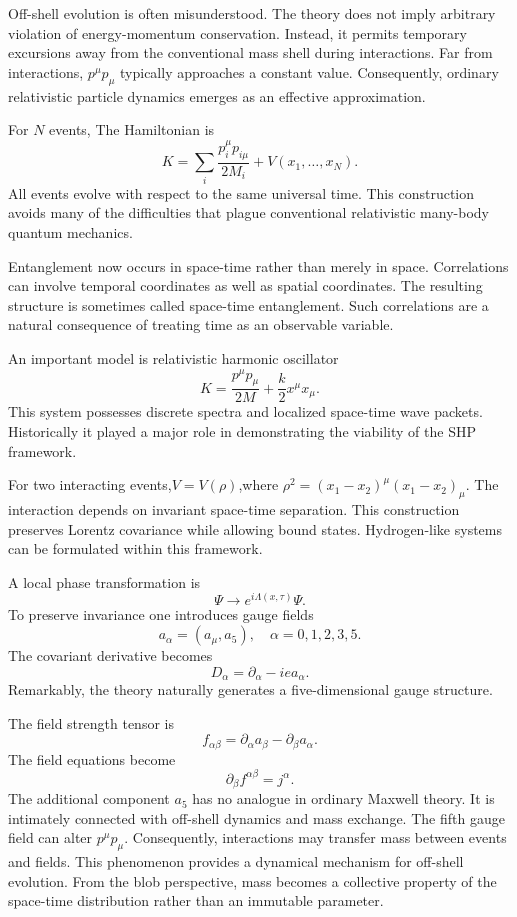 Off-shell evolution is often misunderstood.
The theory does not imply arbitrary violation of energy-momentum conservation.
Instead, it permits temporary excursions away from the conventional mass 
shell during interactions.
Far from interactions,
$p^\mu p_\mu$
typically approaches a constant value.
Consequently, ordinary relativistic particle dynamics emerges as an 
effective approximation.

For $N$ events,
The Hamiltonian is
\begin{equation}
    \label{shp-hn}
K = \sum_i \frac{p_i^\mu p_{i\mu}}{2M_i}+V(x_1,\ldots,x_N).
\end{equation}
All events evolve with respect to the same universal time.
This construction avoids many of the difficulties that plague 
conventional relativistic many-body quantum mechanics.

Entanglement now occurs in space-time rather than merely in space.
Correlations can involve temporal coordinates as well as spatial coordinates.
The resulting structure is sometimes called space-time entanglement.
Such correlations are a natural consequence of treating time as an 
observable variable.

An important model is relativistic harmonic oscillator
\begin{equation}
    \label{shm-osc}
K=\frac{p^\mu p_\mu}{2M}+\frac{k}{2}x^\mu x_\mu.
\end{equation}
This system possesses discrete spectra and localized space-time wave packets.
Historically it played a major role in demonstrating the viability of 
the SHP framework.

For two interacting events,$V=V(\rho)$,where $\rho^2=(x_1-x_2)^\mu(x_1-x_2)_\mu.$
The interaction depends on invariant space-time separation.
This construction preserves Lorentz covariance while allowing bound states.
Hydrogen-like systems can be formulated within this framework.

A local phase transformation is
\[\Psi \rightarrow e^{i\Lambda(x,\tau)}\Psi.\]
To preserve invariance one introduces gauge fields
\[ a_\alpha = (a_\mu,a_5),\quad \alpha=0,1,2,3,5.\]
The covariant derivative becomes
\[
D_\alpha = \partial_\alpha-iea_\alpha.
\]
Remarkably, the theory naturally generates a five-dimensional gauge structure.

The field strength tensor is
\[
f_{\alpha\beta} = \partial_\alpha a_\beta-\partial_\beta a_\alpha.
\]
The field equations become
\[
\partial_\beta f^{\alpha\beta} = j^\alpha.
\]
The additional component $ a_5 $
has no analogue in ordinary Maxwell theory.
It is intimately connected with off-shell dynamics and mass exchange.
The fifth gauge field can alter $ p^\mu p_\mu.$
Consequently, interactions may transfer mass between events and fields.
This phenomenon provides a dynamical mechanism for off-shell evolution.
From the blob perspective, mass becomes a collective property of the 
space-time distribution rather than an immutable parameter.

